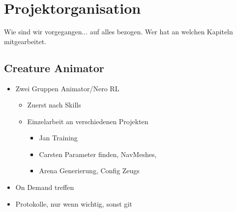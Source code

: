 \section{Projektorganisation}

Wie sind wir vorgegangen... auf alles bezogen. Wer hat an welchen Kapiteln mitgearbeitet.

\subsection{Creature Animator}
\begin{itemize}
	\item Zwei Gruppen Animator/Nero RL
	\begin{itemize}
		\item Zuerst nach Skills
		\item Einzelarbeit an verschiedenen Projekten
		\begin{itemize}
			\item Jan Training
			\item Carsten Parameter finden, NavMeshes, 
			\item Arena Generierung, Config Zeugs
		\end{itemize}
	\end{itemize}
	\item On Demand treffen
	\item Protokolle, nur wenn wichtig, sonst git
\end{itemize}